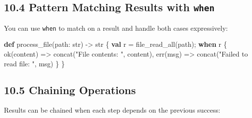 \documentclass[
  english,
]{book}
\newenvironment{Shaded}{\begin{snugshade}}{\end{snugshade}}
\newcommand{\ControlFlowTok}[1]{\textcolor[rgb]{0.77,0.53,0.75}{\textbf{#1}}}
\newcommand{\DataTypeTok}[1]{\textcolor[rgb]{0.31,0.79,0.69}{#1}}
\newcommand{\FunctionTok}[1]{\textcolor[rgb]{0.86,0.86,0.67}{#1}}
\newcommand{\KeywordTok}[1]{\textcolor[rgb]{0.34,0.61,0.84}{\textbf{#1}}}
\newcommand{\NormalTok}[1]{\textcolor[rgb]{0.83,0.83,0.83}{#1}}
\newcommand{\OperatorTok}[1]{\textcolor[rgb]{0.83,0.83,0.83}{#1}}
\newcommand{\StringTok}[1]{\textcolor[rgb]{0.81,0.57,0.47}{#1}}
\begin{document}
\subsection{\texorpdfstring{10.4 Pattern Matching Results with
\texttt{when}}{10.4 Pattern Matching Results with when}}\label{pattern-matching-results-with-when}

You can use \texttt{when} to match on a result and handle both cases
expressively:

\begin{Shaded}
\begin{Highlighting}[]
\KeywordTok{def}\NormalTok{ process\_file(path: }\DataTypeTok{str}\NormalTok{) }\OperatorTok{{-}\textgreater{}} \DataTypeTok{str}\NormalTok{ \{}
    \KeywordTok{val}\NormalTok{ r }\OperatorTok{=}\NormalTok{ file\_read\_all(path);}
    \ControlFlowTok{when}\NormalTok{ r \{}
        \FunctionTok{ok}\NormalTok{(content) }\OperatorTok{=\textgreater{}} \FunctionTok{concat}\NormalTok{(}\StringTok{"File contents: "}\NormalTok{, content),}
        \FunctionTok{err}\NormalTok{(msg)    }\OperatorTok{=\textgreater{}} \FunctionTok{concat}\NormalTok{(}\StringTok{"Failed to read file: "}\NormalTok{, msg)}
\NormalTok{    \}}
\NormalTok{\}}
\end{Highlighting}
\end{Shaded}

\subsection{10.5 Chaining Operations}\label{chaining-operations}

Results can be chained when each step depends on the previous success:
\end{document}
